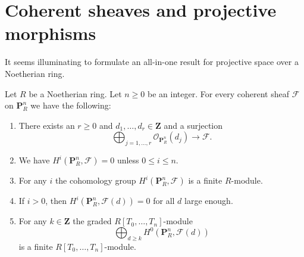 \section{Coherent sheaves and projective morphisms}
\label{section-coherent-projective}

\noindent
It seems illuminating to formulate an all-in-one result for
projective space over a Noetherian ring.

\begin{lemma}
\label{lemma-coherent-projective}
Let $R$ be a Noetherian ring.
Let $n \geq 0$ be an integer.
For every coherent sheaf $\mathcal{F}$ on $\mathbf{P}^n_R$
we have the following:
\begin{enumerate}
\item There exists an $r \geq 0$ and
$d_1, \ldots, d_r \in \mathbf{Z}$ and a surjection
$$
\bigoplus\nolimits_{j = 1, \ldots, r}
\mathcal{O}_{\mathbf{P}^n_R}(d_j)
\longrightarrow
\mathcal{F}.
$$
\item We have $H^i(\mathbf{P}^n_R, \mathcal{F}) = 0$ unless
$0 \leq i \leq n$.
\item For any $i$ the cohomology group $H^i(\mathbf{P}^n_R, \mathcal{F})$
is a finite $R$-module.
\item If $i > 0$, then
$H^i(\mathbf{P}^n_R, \mathcal{F}(d)) = 0$ for all $d$ large enough.
\item For any $k \in \mathbf{Z}$ the graded $R[T_0, \ldots, T_n]$-module
$$
\bigoplus\nolimits_{d \geq k} H^0(\mathbf{P}^n_R, \mathcal{F}(d))
$$
is a finite $R[T_0, \ldots, T_n]$-module.
\end{enumerate}
\end{lemma}

